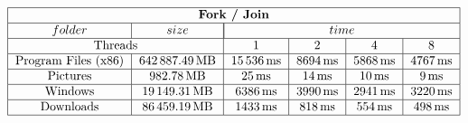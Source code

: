 \documentclass{article}
\begin{document}
    \begin{doublespacing}
      \begin{align*}
        \begin{tabular}{|*{6}{c|}}
          \hline
          \multicolumn{6}{|c|}{\bfseries Fork / Join} \\
          \hline
          $folder$ & $size$ & \multicolumn{4}{|c|}{$time$} \\
          \hline
          \multicolumn{2}{|c|}{Threads} & 1 & 2 & 4 & 8 \\
          \hline
          Program Files (x86) & $\SI{642887.49}{\mega\byte}$ & $\SI{15536}{\milli\second}$ & $\SI{8694}{\milli\second}$ & $\SI{5868}{\milli\second}$ & $\SI{4767}{\milli\second}$ \\
          \hline
          Pictures & $\SI{982.78}{\mega\byte}$ & $\SI{25}{\milli\second}$ & $\SI{14}{\milli\second}$ & $\SI{10}{\milli\second}$ & $\SI{9}{\milli\second}$ \\
          \hline
          Windows & $\SI{19149.31}{\mega\byte}$ & $\SI{6386}{\milli\second}$ & $\SI{3990}{\milli\second}$ & $\SI{2941}{\milli\second}$ & $\SI{3220}{\milli\second}$ \\
          \hline
          Downloads & $\SI{86459.19}{\mega\byte}$ & $\SI{1433}{\milli\second}$ & $\SI{818}{\milli\second}$ & $\SI{554}{\milli\second}$& $\SI{498}{\milli\second}$ \\
          \hline
        \end{tabular}
      \end{align*}
    \end{doublespacing}
\end{document}
